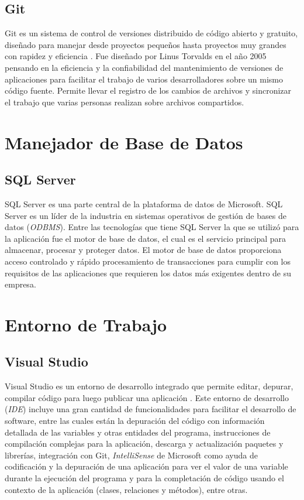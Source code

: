 \subsection{Git}
Git es un sistema de control de versiones distribuido de código abierto y gratuito, diseñado para manejar desde proyectos pequeños hasta proyectos muy grandes con rapidez y eficiencia \cite{git}. Fue diseñado por Linus Torvalds en el año 2005 pensando en la eficiencia y la confiabilidad del mantenimiento de versiones de aplicaciones para facilitar el trabajo de varios desarrolladores sobre un mismo código fuente. Permite llevar el registro de los cambios de archivos y sincronizar el trabajo que varias personas realizan sobre archivos compartidos.

\section{Manejador de Base de Datos}
\subsection{SQL Server}
SQL Server es una parte central de la plataforma de datos de Microsoft. SQL Server es un líder de la industria en sistemas operativos de gestión de bases de datos (\textit{ODBMS})\cite{sqlServerMicrosoft}. Entre las tecnologías que tiene SQL Server la que se utilizó para la aplicación fue el motor de base de datos, el cual es el servicio principal para almacenar, procesar y proteger datos. El motor de base de datos proporciona acceso controlado y rápido procesamiento de transacciones para cumplir con los requisitos de las aplicaciones que requieren los datos más exigentes dentro de su empresa. 

\section{Entorno de Trabajo}
\subsection{Visual Studio}
Visual Studio es un entorno de desarrollo integrado que permite editar, depurar, compilar código para luego publicar una aplicación \cite{visualStudioMicrosoft}. Este entorno de desarrollo (\textit{IDE}) incluye una gran cantidad de funcionalidades para facilitar el desarrollo de software, entre las cuales están la depuración del código con información detallada de las variables y otras entidades del programa, instrucciones de compilación complejas para la aplicación, descarga y actualización paquetes y librerías, integración con Git, \textit{IntelliSense} de Microsoft como ayuda de codificación y la depuración de una aplicación para ver el valor de una variable durante la ejecución del programa y para la completación de código usando el contexto de la aplicación (clases, relaciones y métodos), entre otras.


